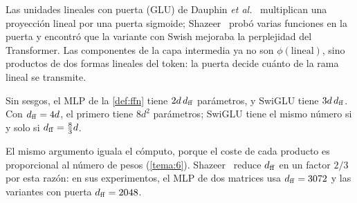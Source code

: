 Las unidades lineales con puerta (GLU) de Dauphin \emph{et al.}~\cite{dauphin} multiplican una proyección lineal por una puerta sigmoide; Shazeer~\cite[§2]{shazeer} probó varias funciones en la puerta y encontró que la variante con Swish mejoraba la perplejidad del Transformer. Las componentes de la capa intermedia ya no son $\phi(\text{lineal})$, sino productos de dos formas lineales del token: la puerta decide cuánto de la rama lineal se transmite.

\begin{proposicion}\label{prop:presupuesto}
Sin sesgos, el MLP de la \cref{def:ffn} tiene $2d\,d_{\mathrm{ff}}$ parámetros, y SwiGLU tiene $3d\,d_{\mathrm{ff}}$. Con $d_{\mathrm{ff}}=4d$, el primero tiene $8d^{2}$ parámetros; SwiGLU tiene el mismo número si y solo si $d_{\mathrm{ff}}=\frac83 d$.
\end{proposicion}

El mismo argumento iguala el cómputo, porque el coste de cada producto es proporcional al número de pesos (\cref{tema:6}). Shazeer~\cite[§2]{shazeer} reduce $d_{\mathrm{ff}}$ en un factor $2/3$ por esta razón: en sus experimentos, el MLP de dos matrices usa $d_{\mathrm{ff}}=3072$ y las variantes con puerta $d_{\mathrm{ff}}=2048$.

\addtocounter{definicion}{1}%

\addtocounter{definicion}{1}%

